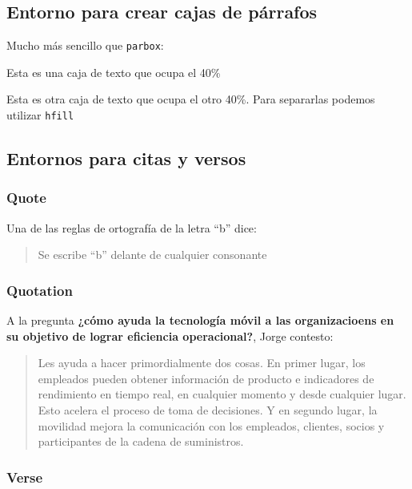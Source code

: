 \documentclass[11pt,twoside,a4paper]{article}
\begin{document}
\subsection{Entorno para crear cajas de párrafos}
\label{sec:entornocajasparrafos}
Mucho más sencillo que \texttt{parbox}:

\begin{minipage}[l]{0.4\linewidth}
Esta es una caja de texto que ocupa el 40\%
\end{minipage}
\hfill{}
\begin{minipage}[r]{0.4\linewidth}
  Esta es otra caja de texto que ocupa el otro 40\%. Para separarlas podemos utilizar \texttt{hfill}
\end{minipage}

\subsection{Entornos para citas y versos}
\label{sec:entornoscitasyversos}

\subsubsection{Quote}
\label{sec:quote}

Una de las reglas de ortografía de la letra ``b'' dice:
\begin{quote}
  Se escribe ``b'' delante de cualquier consonante
\end{quote}

\subsubsection{Quotation}
\label{sec:quotation}

A la pregunta \textbf{¿cómo ayuda la tecnología móvil a las organizacioens en su objetivo de lograr eficiencia operacional?}, Jorge contesto:
\begin{quotation}
  Les ayuda a hacer primordialmente dos cosas.
En primer lugar, los empleados pueden obtener información de producto e indicadores de rendimiento en tiempo real, en cualquier momento y desde cualquier lugar. Esto acelera el proceso de toma de decisiones.
Y en segundo lugar, la movilidad mejora la comunicación con los empleados, clientes, socios y participantes de la cadena de suministros.
\end{quotation}

\subsubsection{Verse}
\label{sec:verse}
\end{document}
